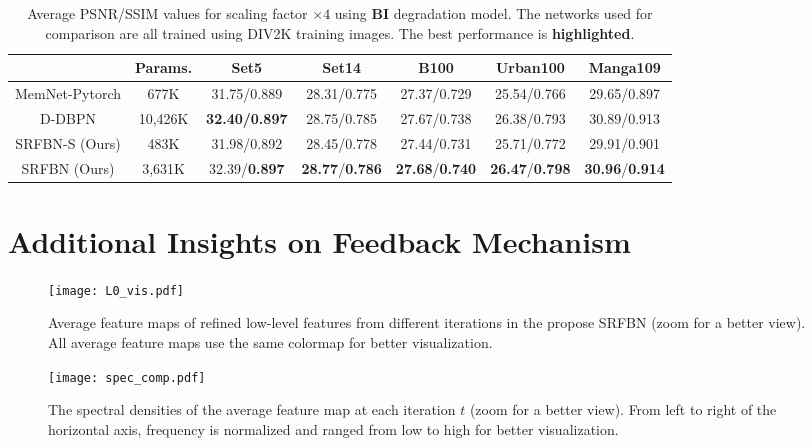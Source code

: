 \documentclass[10pt,twocolumn,letterpaper]{article}
\begin{document}
\begin{table*}[h]
	\begin{center}
		\begin{tabular}{|c|c|c|c|c|c|c|}
			\hline
			& Params. & Set5        & Set14       & B100        & Urban100    & Manga109    \\ \hline\hline
			MemNet-Pytorch  &  677K &  31.75/0.889           &   28.31/0.775          &  27.37/0.729           &   25.54/0.766          &  29.65/0.897           \\ \hline
			D-DBPN \cite{Haris_2018_CVPR} &  10,426K   & \textbf{32.40/0.897} & 28.75/0.785 & 27.67/0.738 & 26.38/0.793 & 30.89/0.913 \\ \hline
			SRFBN-S (Ours) &  483K &  31.98/0.892           &   28.45/0.778          &  27.44/0.731          &   25.71/0.772          &  29.91/0.901         \\ \hline
			SRFBN (Ours) &  3,631K   &   32.39/\textbf{0.897}        &    \textbf{28.77}/\textbf{0.786}         &    \textbf{27.68}/\textbf{0.740}         &       \textbf{26.47}/\textbf{0.798 }    &  \textbf{30.96}/\textbf{0.914} \\ \hline         
		
		\end{tabular}
		\medskip
		\caption{Average PSNR/SSIM values for scaling factor $\times4$ using \textbf{BI} degradation model. The networks used for comparison are all trained using DIV2K training images. The best performance is \textbf{highlighted}.}
		\label{div2k_comp}			
	\end{center}
\end{table*}

\section{Additional Insights on Feedback Mechanism}
\begin{figure}[t]
	\centering
	\texttt{[image: L0\_vis.pdf]}
	\caption{Average feature maps of refined low-level features from different iterations in the propose SRFBN (zoom for a better view). All average feature maps use the same colormap for better visualization.}\label{L0_vis}\end{figure}

\begin{figure}[t]
	\centering
	\texttt{[image: spec\_comp.pdf]}
	\caption{The spectral densities of the average feature map at each iteration $t$ (zoom for a better view). From left to right of the horizontal axis, frequency is normalized and ranged from low to high for better visualization.}\label{spec_comp}\end{figure}
\end{document}
